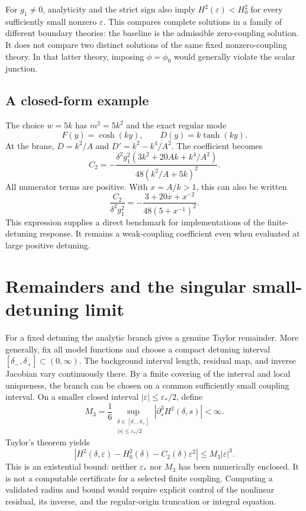 \documentclass[11pt]{article}
\newcommand{\eps}{\varepsilon}
\begin{document}
For $g_1\ne0$, analyticity and the strict sign also imply $H^2(\eps)<H_0^2$ for every sufficiently small nonzero $\eps$. This compares complete solutions in a family of different boundary theories: the baseline is the admissible zero-coupling solution. It does not compare two distinct solutions of the same fixed nonzero-coupling theory. In that latter theory, imposing $\phi=\phi_0$ would generally violate the scalar junction.

\subsection{A closed-form example}
The choice $w=5k$ has $m^2=5k^2$ and the exact regular mode
\begin{equation}
F(y)=\cosh(ky),\qquad D(y)=k\tanh(ky).
\end{equation}
At the brane, $D=k^2/A$ and $D'=k^2-k^4/A^2$. The coefficient becomes
\begin{equation}
C_2=-\frac{\delta^2g_1^2
\left(3k^2+20Ak+k^4/A^2\right)}
{48\left(k^2/A+5k\right)^2}.\label{eq:example}
\end{equation}
All numerator terms are positive. With $x=A/k>1$, this can also be written
\begin{equation}
\frac{C_2}{\delta^2g_1^2}
=-\frac{3+20x+x^{-2}}{48(5+x^{-1})^2}.
\end{equation}
This expression supplies a direct benchmark for implementations of the finite-detuning response. It remains a weak-coupling coefficient even when evaluated at large positive detuning.

\section{Remainders and the singular small-detuning limit}\label{sec:limits}
For a fixed detuning the analytic branch gives a genuine Taylor remainder. More generally, fix all model functions and choose a compact detuning interval
$[\delta_-,\delta_+]\subset(0,\infty)$. The background interval length, residual map, and inverse Jacobian vary continuously there. By a finite covering of the interval and local uniqueness, the branch can be chosen on a common sufficiently small coupling interval. On a smaller closed interval $|\eps|\le\eps_*/2$, define
\begin{equation}
M_3=\frac16\sup_{\substack{\delta\in[\delta_-,\delta_+]\\|s|\le\eps_*/2}}
\left|\partial_s^3 H^2(\delta,s)\right|<\infty.
\end{equation}
Taylor's theorem yields
\begin{equation}
\left|H^2(\delta,\eps)-H_0^2(\delta)-C_2(\delta)\eps^2\right|
\le M_3|\eps|^3.\label{eq:remainder}
\end{equation}
This is an existential bound: neither $\eps_*$ nor $M_3$ has been numerically enclosed. It is not a computable certificate for a selected finite coupling. Computing a validated radius and bound would require explicit control of the nonlinear residual, its inverse, and the regular-origin truncation or integral equation.
\end{document}
